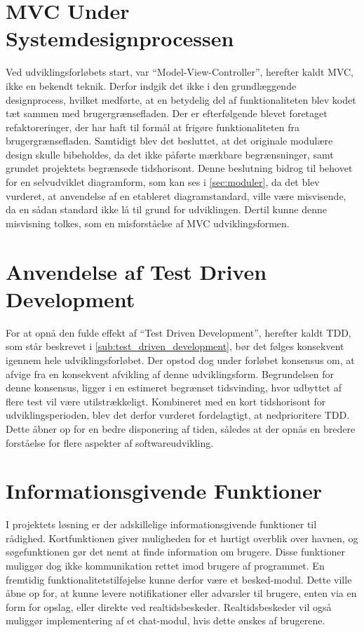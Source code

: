 \section{MVC Under Systemdesignprocessen}

Ved udviklingsforløbets start, var \enquote{Model-View-Controller}, herefter kaldt MVC, ikke en bekendt teknik. Derfor indgik det ikke i den grundlæggende designprocess, hvilket medførte, at en betydelig del af funktionaliteten blev kodet tæt sammen med brugergrænsefladen. Der er efterfølgende blevet foretaget refaktoreringer, der har haft til formål at frigøre funktionaliteten fra brugergrænsefladen. Samtidigt blev det besluttet, at det originale modulære design skulle bibeholdes, da det ikke påførte mærkbare begrænsninger, samt grundet projektets begrænsede tidshorisont. Denne beslutning bidrog til behovet for en selvudviklet diagramform, som kan ses i \cref{sec:moduler}, da det blev vurderet, at anvendelse af en etableret diagramstandard, ville være misvisende, da en sådan standard ikke lå til grund for udviklingen. Dertil kunne denne misvisning tolkes, som en misforståelse af MVC udviklingsformen.

\section{Anvendelse af Test Driven Development}

For at opnå den fulde effekt af \enquote{Test Driven Development}, herefter kaldt TDD, som står beskrevet i \cref{sub:test_driven_development}, bør det følges konsekvent igennem hele udviklingsforløbet. Der opstod dog under forløbet konsensus om, at afvige fra en konsekvent afvikling af denne udviklingsform. Begrundelsen for denne konsensus, ligger i en estimeret begrænset tidsvinding, hvor udbyttet af flere test vil være utilstrækkeligt. Kombineret med en kort tidshorisont for udviklingsperioden, blev det derfor vurderet fordelagtigt, at nedprioritere TDD. Dette åbner op for en bedre disponering af tiden, således at der opnås en bredere forståelse for flere aspekter af softwareudvikling.

\section{Informationsgivende Funktioner}

I projektets løsning er der adskillelige informationsgivende funktioner til rådighed. Kortfunktionen giver muligheden for et hurtigt overblik over havnen, og søgefunktionen gør det nemt at finde information om brugere. Disse funktioner muliggør dog ikke kommunikation rettet imod brugere af programmet. En fremtidig funktionalitetstilføjelse kunne derfor være et besked-modul. Dette ville åbne op for, at kunne levere notifikationer eller advarsler til brugere, enten via en form for opslag, eller direkte ved realtidsbeskeder. Realtidsbeskeder vil også muliggør implementering af et chat-modul, hvis dette ønskes af brugerene.

